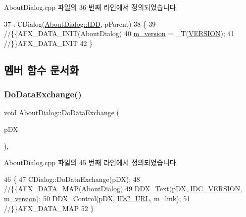 About\+Dialog.\+cpp 파일의 36 번째 라인에서 정의되었습니다.


\begin{DoxyCode}
37   : CDialog(\mbox{\hyperlink{class_about_dialog_ad39ef53347d21ec0cb70ff40df557e61a5abcac78e55566777388160cfcf0112c}{AboutDialog::IDD}}, pParent)
38 \{
39   \textcolor{comment}{//\{\{AFX\_DATA\_INIT(AboutDialog)}
40   \mbox{\hyperlink{class_about_dialog_a78e658a0c2d03632ce86a675b89d8492}{m\_version}} = \_T(\mbox{\hyperlink{_auto_build_8h_a1c6d5de492ac61ad29aec7aa9a436bbf}{VERSION}});
41   \textcolor{comment}{//\}\}AFX\_DATA\_INIT}
42 \}
\end{DoxyCode}


\subsection{멤버 함수 문서화}
\mbox{\label{class_about_dialog_a098f0327b766a8c3fff0fef3076dc9eb}} 
\subsubsection{\texorpdfstring{Do\+Data\+Exchange()}{DoDataExchange()}}
{\footnotesize\ttfamily void About\+Dialog\+::\+Do\+Data\+Exchange (\begin{DoxyParamCaption}\item[{C\+Data\+Exchange $\ast$}]{p\+DX }\end{DoxyParamCaption})\hspace{0.3cm}{\ttfamily [protected]}, {\ttfamily [virtual]}}



About\+Dialog.\+cpp 파일의 45 번째 라인에서 정의되었습니다.


\begin{DoxyCode}
46 \{
47   CDialog::DoDataExchange(pDX);
48   \textcolor{comment}{//\{\{AFX\_DATA\_MAP(AboutDialog)}
49   DDX\_Text(pDX, \mbox{\hyperlink{resource_8h_a57b3cae2964c6fe360b5d2189140fb3b}{IDC\_VERSION}}, \mbox{\hyperlink{class_about_dialog_a78e658a0c2d03632ce86a675b89d8492}{m\_version}});
50   DDX\_Control(pDX, \mbox{\hyperlink{resource_8h_a05a0c29c2d7ff2aef0dfe56ca2e85115}{IDC\_URL}}, m\_link);
51   \textcolor{comment}{//\}\}AFX\_DATA\_MAP}
52 \}
\end{DoxyCode}
\mbox{\label{class_about_dialog_ab42eeca93160e48d480b004aaf33c353}} 
